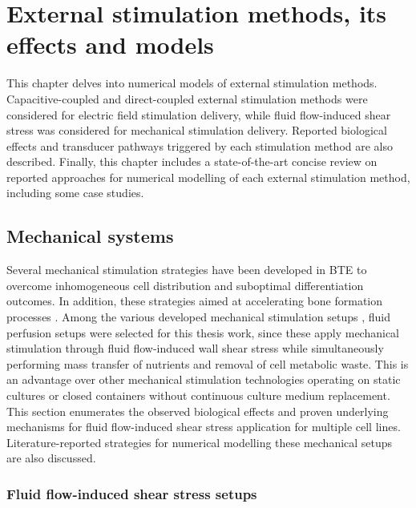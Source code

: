 
%


\newpage
\chapter{External stimulation methods, its effects and models}
This chapter delves into numerical models of external stimulation methods. Capacitive-coupled and direct-coupled external stimulation methods were considered for electric field stimulation delivery, while fluid flow-induced shear stress was considered for mechanical stimulation delivery. Reported biological effects and transducer pathways triggered by each stimulation method are also described. Finally, this chapter includes a state-of-the-art concise review on reported approaches for numerical modelling of each external stimulation method, including some case studies. 



\newpage
\section{Mechanical systems}
Several mechanical stimulation strategies have been developed in \ac{BTE} to overcome inhomogeneous cell distribution and suboptimal differentiation outcomes. In addition, these strategies aimed at accelerating bone formation processes \cite{Melke2018-kv}. Among the various developed mechanical stimulation setups \cite{Melo-Fonseca2023-fd}, fluid perfusion setups were selected for this thesis work, since these apply mechanical stimulation through fluid flow-induced wall shear stress while simultaneously performing mass transfer of nutrients and removal of cell metabolic waste. This is an advantage over other mechanical stimulation technologies operating on static cultures or closed containers without continuous culture medium replacement. This section enumerates the observed biological effects and proven underlying mechanisms for fluid flow-induced shear stress application for multiple cell lines. Literature-reported strategies for numerical modelling these mechanical setups are also discussed. 


\subsection{Fluid flow-induced shear stress setups}


